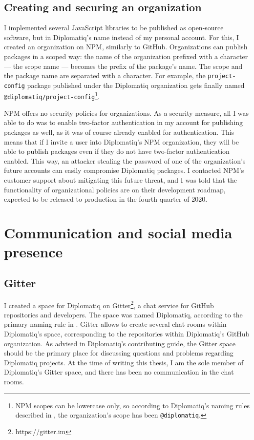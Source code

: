\subsection{Creating and securing an organization}

I implemented several JavaScript libraries to be published as open-source software, but in Diplomatiq's name instead of my personal account. For this, I created an organization on NPM, similarly to GitHub. Organizations can publish packages in a scoped way: the name of the organization prefixed with a  character — the scope name — becomes the prefix of the package's name. The scope and the package name are separated with a \textquote{/} character. For example, the \lstinline{project-config} package published under the Diplomatiq organization gets finally named \lstinline{@diplomatiq/project-config}\footnote{NPM scopes can be lowercase only, so according to Diplomatiq's naming rules described in , the organization's scope has been \lstinline{@diplomatiq}.}.

NPM offers no security policies for organizations. As a security measure, all I was able to do was to enable two-factor authentication in my account for publishing packages as well, as it was of course already enabled for authentication. This means that if I invite a user into Diplomatiq's NPM organization, they will be able to publish packages even if they do not have two-factor authentication enabled. This way, an attacker stealing the password of one of the organization's future accounts can easily compromise Diplomatiq packages. I contacted NPM's customer support about mitigating this future threat, and I was told that the functionality of organizational policies are on their development roadmap, expected to be released to production in the fourth quarter of 2020.

\section{Communication and social media presence}

\subsection{Gitter}

I created a space for Diplomatiq on Gitter\footnote{https://gitter.im}, a chat service for GitHub repositories and developers. The space was named Diplomatiq, according to the primary naming rule in . Gitter allows to create several chat rooms within Diplomatiq's space, corresponding to the repositories within Diplomatiq's GitHub organization. As advised in Diplomatiq's contributing guide, the Gitter space should be the primary place for discussing questions and problems regarding Diplomatiq projects. At the time of writing this thesis, I am the sole member of Diplomatiq's Gitter space, and there has been no communication in the chat rooms.

